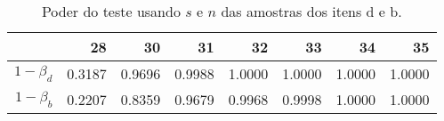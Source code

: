 \begin{table}[ht]
\centering
\caption{Poder do teste usando $s$ e $n$ das amostras dos itens d e b.} 
\label{tb:1d}
\begin{tabular}{rrrrrrrr}
  \toprule
 & 28 & 30 & 31 & 32 & 33 & 34 & 35 \\ 
  \midrule
$1-\beta_d$ & 0.3187 & 0.9696 & 0.9988 & 1.0000 & 1.0000 & 1.0000 & 1.0000 \\ 
  $1-\beta_b$ & 0.2207 & 0.8359 & 0.9679 & 0.9968 & 0.9998 & 1.0000 & 1.0000 \\ 
   \bottomrule
\end{tabular}
\end{table}
